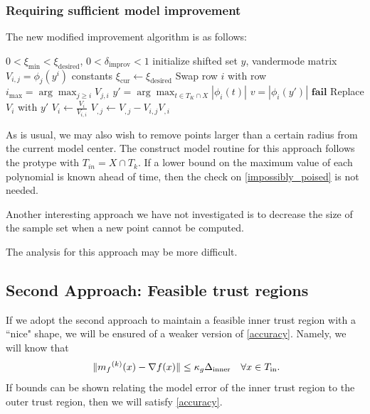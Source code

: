 \subsubsection{Requiring sufficient model improvement}

The new modified improvement algorithm is as follows:

\begin{algorithmic}[1]
\State $0 < \xi_{\text{min}} < \xi_{\text{desired}}$, $0 <\delta_{\text{improv}} < 1$
\State initialize shifted set $y$, vandermode matrix $V_{i,j} = \phi_j(y^i)$ constants
\State $\xi_{\text{cur}} \gets \xi_{\text{desired}}$
    \State Swap row $i$ with row $i_{\max} = \arg \max_{j\ge i} V_{j,i} $
        \State $y' = \arg\max_{t \in T_K \cap X} |\phi_i(t)|$
        \State $v = |\phi_i(y')|$
            \State $\mathbf {fail}$
        \EndIf
            \State Replace $V_i$ with $y'$
        \EndIf
    \EndIf
    \State $V_i \gets \frac{V_i}{V_{i,i}} $
        \State $V_{,j} \gets V_{, j} - V_{i,j} V_{, i}$
    \EndFor
\EndFor
\end{algorithmic}

As is usual, we may also wish to remove points larger than a certain radius from the current model center.
The construct model routine for this approach follows the protype with $T_{in} = X \cap  T_k$.
If a lower bound on the maximum value of each polynomial is known ahead of time, then the check on \ref{impossibly_poised} is not needed.

Another interesting approach we have not investigated is to decrease the size of the sample set when a new point cannot be computed.


The analysis for this approach may be more difficult.




\subsection{Second Approach: Feasible trust regions}

If we adopt the second approach to maintain a feasible inner trust region with a ``nice" shape, we will be ensured of a weaker version of \ref{accuracy}.
Namely, we will know that 
\[\
    \|{{m}_f}^{(k)}(x) - \nabla f(x) \| \le \kappa_g \Delta_{\text{inner}} \quad \forall x \in T_{\text{in}}.
\]
If bounds can be shown relating the model error of the inner trust region to the outer trust region, then we will satisfy \ref{accuracy}.

